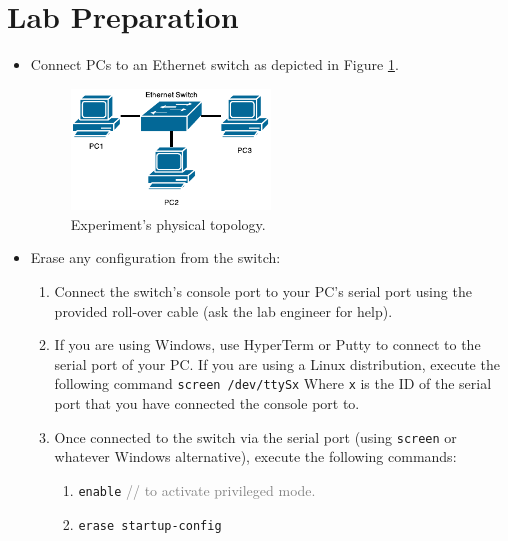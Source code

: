 \documentclass[pdftex,12pt,a4paper]{article}
\begin{document}
    \section{Lab Preparation}
        \begin{itemize}
            \item Connect PCs to an Ethernet switch as depicted in Figure
            \ref{fig:netdiag}.
                \begin{figure}[tbh]
                    \centering
                    \includegraphics[width=0.5\textwidth]{figures/netdiag}
                    \caption{Experiment's physical topology.}
                    \label{fig:netdiag}
                \end{figure}
            \item Erase any configuration from the switch:
                \begin{enumerate}
                    \item Connect the switch's console port to your PC's serial port
                    using the provided roll-over cable (ask the lab engineer
                    for help).
                    \item If you are using Windows, use HyperTerm or Putty to
                    connect to the serial port of your PC. If you are using a
                    Linux distribution, execute the following command
                    \texttt{screen /dev/ttySx} Where \texttt{x} is the ID of
                    the serial port that you have connected the console port
                    to.
                    \item Once connected to the switch via the serial port
                    (using \texttt{screen} or whatever Windows alternative),
                    execute the following commands:
                        \begin{enumerate}
                            \item \texttt{enable} \textcolor{gray}{// to
                            activate privileged mode.}
                            \item \texttt{erase startup-config}

\end{enumerate}
\end{enumerate}
\end{itemize}
\end{document}
